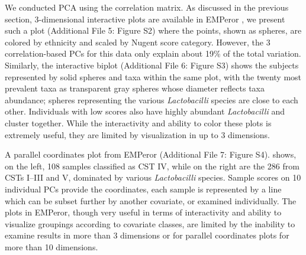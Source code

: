 \documentclass[doublespacing]{bmcart}
\def\texttt{[image: ]}
\begin{document}

We conducted PCA using the correlation matrix. As discussed in the previous section, 3-dimensional interactive plots are available in EMPeror \cite{emperor}, we present such a plot  (Additional File 5: Figure S2)  where the points, shown as spheres, are colored by ethnicity and scaled by Nugent score category. However, the 3 correlation-based PCs for this data only explain about 19\% of the total variation. Similarly, the interactive biplot  (Additional File 6: Figure S3) shows the subjects represented by solid spheres and taxa within the same plot, with the twenty most prevalent taxa as transparent gray spheres whose diameter reflects taxa abundance; spheres representing the various \textit{Lactobacilli} species are close to each other. Individuals with low scores also have highly abundant \textit{Lactobacilli} and cluster together. While the interactivity and ability to color these plots is extremely useful, they are limited by visualization in up to 3 dimensions. 

A parallel coordinates plot from EMPeror (Additional File 7: Figure S4). shows, on the left, 108 samples classified as CST IV, while on the right are the 286 from CSTs I--III and V,  dominated by various \textit{Lactobacilli} species. Sample scores on 10 individual PCs provide the coordinates, each sample is represented by a line which can be subset further by another covariate, or examined individually. The plots in EMPeror, though very useful in terms of interactivity and ability to visualize groupings according to covariate classes, are limited by the inability to examine results in more than 3 dimensions or for parallel coordinates plots for more than 10 dimensions.  
\end{document}

